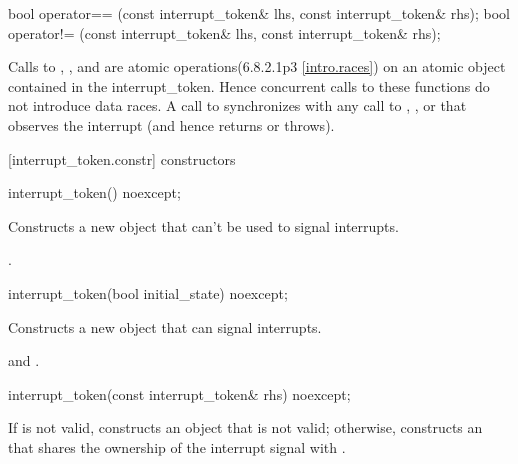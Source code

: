 {\begin{codeblock}
bool operator== (const interrupt_token& lhs, const interrupt_token& rhs);
bool operator!= (const interrupt_token& lhs, const interrupt_token& rhs);
\end{codeblock}

Calls to , , and 
are atomic operations(6.8.2.1p3 \ref{intro.races}) on an atomic object contained in the interrupt_token.
Hence concurrent calls to these functions do not introduce data races. 
A call to  synchronizes with any call to ,
, or  that observes the interrupt
(and hence returns  or throws).

[interrupt_token.constr]{ constructors}

%
\begin{itemdecl}
interrupt_token() noexcept;
\end{itemdecl}
\begin{itemdescr}
  \pnum\effects Constructs a new  object that can't be used to signal interrupts.

  \pnum\postconditions {}.
\end{itemdescr}

%
\begin{itemdecl}
interrupt_token(bool initial_state) noexcept;
\end{itemdecl}
\begin{itemdescr}
  \pnum\effects Constructs a new  object that can signal interrupts.

  \pnum\postconditions {} and .
\end{itemdescr}

%
\begin{itemdecl}
interrupt_token(const interrupt_token& rhs) noexcept;
\end{itemdecl}
\begin{itemdescr}
  \pnum\effects If  is not valid, constructs an  object
                that is not valid;
                otherwise, constructs an 
                that shares the ownership of the interrupt signal with .


\end{itemdescr}}
